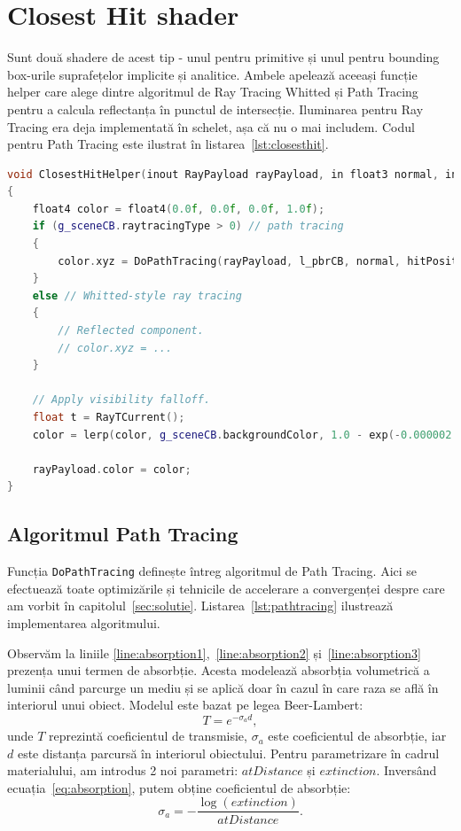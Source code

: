 \documentclass[12pt,a4paper]{report}
\numberwithin{equation}{section} %
\begin{document}
\section{Closest Hit shader}
Sunt două shadere de acest tip - unul pentru primitive și unul pentru bounding box-urile
suprafețelor implicite și analitice. Ambele apelează aceeași funcție helper care alege
dintre algoritmul de Ray Tracing Whitted și Path Tracing pentru a calcula reflectanța în punctul
de intersecție. Iluminarea pentru Ray Tracing era deja implementată în schelet, așa că nu o mai
includem. Codul pentru Path Tracing este ilustrat în listarea~\ref{lst:closesthit}.
\begin{lstlisting}[caption={Closest Hit helper pentru Path Tracing},label={lst:closesthit},language=C++]
void ClosestHitHelper(inout RayPayload rayPayload, in float3 normal, in float3 hitPosition)
{
	float4 color = float4(0.0f, 0.0f, 0.0f, 1.0f);
	if (g_sceneCB.raytracingType > 0) // path tracing
	{
		color.xyz = DoPathTracing(rayPayload, l_pbrCB, normal, hitPosition, RayTCurrent());
	}
	else // Whitted-style ray tracing
	{
		// Reflected component.
		// color.xyz = ...
	}

	// Apply visibility falloff.
	float t = RayTCurrent();
	color = lerp(color, g_sceneCB.backgroundColor, 1.0 - exp(-0.000002 * t * t * t));

	rayPayload.color = color;
}
\end{lstlisting}

\subsection{Algoritmul Path Tracing}
Funcția \texttt{DoPathTracing} definește întreg algoritmul de Path Tracing. Aici
se efectuează toate optimizările și tehnicile de accelerare a convergenței
despre care am vorbit în capitolul~\ref{sec:solutie}. Listarea~\ref{lst:pathtracing}
ilustrează implementarea algoritmului.

Observăm la liniile \ref{line:absorption1},~\ref{line:absorption2} și~\ref{line:absorption3}
prezența unui termen de absorbție. Acesta modelează absorbția volumetrică a luminii
când parcurge un mediu și se aplică doar în cazul în care raza se află
în interiorul unui obiect. Modelul este bazat pe legea Beer-Lambert:
\begin{equation}\label{eq:absorption}
	T = e^{-\sigma_a d},
\end{equation}
unde $T$ reprezintă coeficientul de transmisie, $\sigma_a$ este coeficientul de absorbție,
iar $d$ este distanța parcursă în interiorul obiectului.
Pentru parametrizare în cadrul materialului, am introdus 2 noi parametri: $atDistance$ și
$extinction$. Inversând ecuația~\ref{eq:absorption}, putem obține coeficientul de absorbție:
\begin{equation}
	\sigma_a = -\dfrac{\log(extinction)}{atDistance}.
\end{equation}
\end{document}
